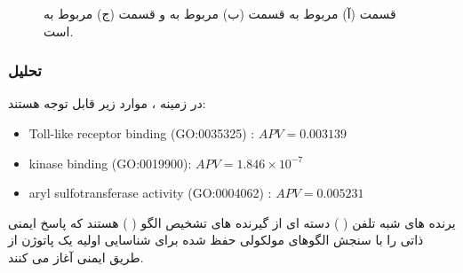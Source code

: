 \documentclass[12pt]{article}
\begin{document}
\begin{figure}[h!]
\begin{minipage}{.5\linewidth}
\end{minipage}\par\medskip
\centering
{}
\label{fig:path_up}
\caption{
قسمت (آ) مربوط به  قسمت (ب) مربوط به  و قسمت (ج) مربوط به  است.
}
\end{figure}



\newpage

\subsubsection{تحلیل}


در زمینه ، موارد زیر قابل توجه هستند:

\begin{latin}
	\begin{itemize}
		\item  {Toll-like receptor binding (GO:0035325)} : $APV =0.003139$
		
		\item  {kinase binding  (GO:0019900)}: $APV = 1.846 \times 10^{-7}	$ 
		
		\item {aryl sulfotransferase activity (GO:0004062)}  : $APV = 0.005231$ 
	\end{itemize}
\end{latin}

یرنده های شبه تلفن (
) دسته ای از گیرنده های تشخیص الگو (
) هستند که پاسخ ایمنی ذاتی را با سنجش الگوهای مولکولی حفظ شده برای شناسایی اولیه یک پاتوژن از طریق ایمنی آغاز می کنند.
\end{document}
